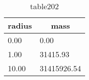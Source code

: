\newcommand*{\thead}[1]{\multicolumn{1}{c}{\bfseries #1}}%
\newcommand*{\unitHead}[1]{\multicolumn{1}{c}{\si{#1}}}%

\begin{table}[h]%
\centering%
\begin{tabular}{ll}%
\toprule%
\thead{radius}&\thead{mass}\\
\toprule%
0.00	&	0.00 \\%
1.00	&	31415.93 \\%
10.00	&	31415926.54 \\%
\bottomrule%
\end{tabular}%
\caption{table202}%
\label{tab:table202}%
\end{table}%